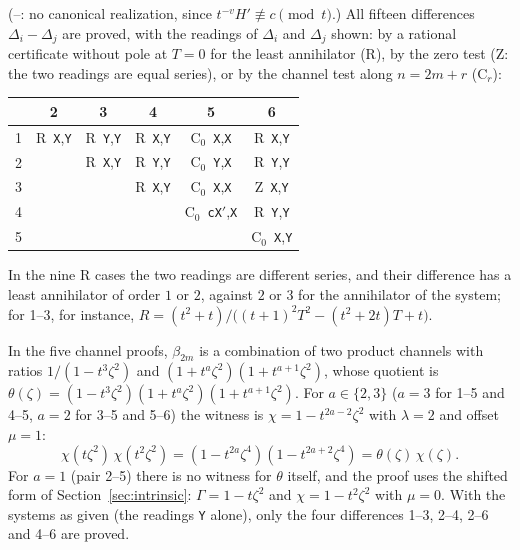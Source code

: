 \documentclass[11pt,a4paper]{article}
\theoremstyle{plain}
\theoremstyle{definition}
\theoremstyle{remark}
\begin{document}
(--: no canonical realization, since $t^{-v}H'\not\equiv c\pmod t$.) All
fifteen differences $\Delta_i-\Delta_j$ are proved, with the readings of
$\Delta_i$ and $\Delta_j$ shown: by a rational certificate without pole at $T=0$
for the least annihilator (R), by the zero test (Z: the two readings are equal
series), or by the channel test along $n=2m+r$ (C$_r$):
\begin{center}
\small
\begin{tabular}{@{}c|ccccc@{}}
 & 2 & 3 & 4 & 5 & 6\\\hline
1 & R\ \texttt{X},\texttt{Y} & R\ \texttt{Y},\texttt{Y} & R\ \texttt{X},\texttt{Y} & C$_0$\ \texttt{X},\texttt{X} & R\ \texttt{X},\texttt{Y}\\
2 & & R\ \texttt{X},\texttt{Y} & R\ \texttt{Y},\texttt{Y} & C$_0$\ \texttt{Y},\texttt{X} & R\ \texttt{Y},\texttt{Y}\\
3 & & & R\ \texttt{X},\texttt{Y} & C$_0$\ \texttt{X},\texttt{X} & Z\ \texttt{X},\texttt{Y}\\
4 & & & & C$_0$\ \texttt{cX$'$},\texttt{X} & R\ \texttt{Y},\texttt{Y}\\
5 & & & & & C$_0$\ \texttt{X},\texttt{Y}
\end{tabular}
\end{center}
In the nine R cases the two readings are different series, and their
difference has a least annihilator of order $1$ or $2$, against $2$ or $3$ for
the annihilator of the system; for 1--3, for instance,
$R=(t^2+t)/\bigl((t+1)^2T^2-(t^2+2t)T+t\bigr)$.

In the five channel proofs, $\beta_{2m}$ is a combination of two product
channels with ratios $1/(1-t^3\zeta^2)$ and $(1+t^{a}\zeta^2)(1+t^{a+1}\zeta^2)$,
whose quotient is $\theta(\zeta)=(1-t^3\zeta^2)(1+t^a\zeta^2)(1+t^{a+1}\zeta^2)$.
For $a\in\{2,3\}$ ($a=3$ for 1--5 and 4--5, $a=2$ for 3--5 and 5--6) the witness
is $\chi=1-t^{2a-2}\zeta^2$ with $\lambda=2$ and offset $\mu=1$:
\[
  \chi(t\zeta^2)\,\chi(t^2\zeta^2)=(1-t^{2a}\zeta^4)(1-t^{2a+2}\zeta^4)=\theta(\zeta)\,\chi(\zeta).
\]
For $a=1$ (pair 2--5) there is no witness for $\theta$ itself, and the proof
uses the shifted form of Section~\ref{sec:intrinsic}: $\Gamma=1-t\zeta^2$ and
$\chi=1-t^2\zeta^2$ with $\mu=0$. With the systems as given (the readings
\texttt{Y} alone), only the four differences 1--3, 2--4, 2--6 and 4--6 are
proved.
\end{document}
